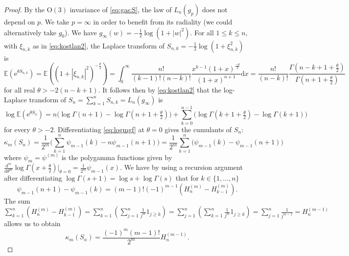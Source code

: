 \documentclass[10pt,a4paper]{amsart}
\begin{document}
\begin{proof}
  By the $\mathrm{O}(3)$ invariance of \eqref{eq:gas:S}, the law of
  $L_n(g_p)$ does not depend on $p$. We take $p=\infty$ in order to benefit from its radiality (we could alternatively take $g_0$). We have
  $g_\infty(w)=-\frac{1}{2}\log(1+|w|^2)$. For all $1\leq k\leq n$, with
  $\xi_{n,k}$ as in \eqref{eq:kostlan2}, the Laplace transform of
  $S_{n,k}=-\frac{1}{2}\log(1+\xi_{n,k}^2)$ is 
  \begin{equation}\label{eq:lap_uinf_wnk}
    \mathbb{E}(\mathrm{e}^{\theta S_{n,k}})
    =\mathbb{E}((1+|\xi_{n,k}|^2)^{-\frac{\theta}{2}})
    =\int_0^\infty\frac{n!}{(k-1)!(n-k)!}\frac{x^{k-1}(1+x)^{\frac{-\theta}{2}}}{(1+x)^{n+1}}\mathrm{d}x
    =\frac{n!}{(n-k)!}\frac{\Gamma(n-k+1+\frac{\theta}{2})}{\Gamma(n+1+\frac{\theta}{2})}
  \end{equation}
  for all real $\theta>-2(n-k+1)$. It follows then by \eqref{eq:kostlan2} that
  the log-Laplace transform of $S_n=\sum_{k=1}^nS_{n,k}=L_n(g_\infty)$ is
  \begin{equation}\label{eq:logmgf}
    \log\mathbb{E}(\mathrm{e}^{\theta S_n})
    =n\bigl(\log\Gamma(n+1)-\log\Gamma(n+1+\tfrac{\theta}{2})\bigr)
    +\sum_{k=0}^{n-1}\bigl(\log\Gamma(k+1+\tfrac{\theta}{2})-\log\Gamma(k+1)\bigr)
  \end{equation}
  for every $\theta > -2$. Differentiating
  \eqref{eq:logmgf} at $\theta=0$ gives the cumulants of $S_n$:
  \begin{equation}\label{eq:cum-psi}
    \kappa_m(S_n)
    =
      \frac{1}{2^m}\big(\sum_{k=1}^n \psi_{m-1}(k)-n\psi_{m-1}(n+1)\big)
    =\frac{1}{2^m}\sum_{k=1}^n \big(\psi_{m-1}(k)-
    \psi_{m-1}(n+1) \big)  
  \end{equation}
  where $\psi_m=\psi^{(m)}$ is the polygamma
  functions given by
  $\frac{\mathrm{d}^m}{\mathrm{d}\theta^m}\log\Gamma(x+\tfrac{\theta}{2})\big|_{\theta=0}=\frac{1}{2^m}\psi_{m-1}(x)$.
  We have by using a recursion argument after
  differentiating $\log \Gamma(s+1) = \log s + \log \Gamma(s)$ that for
  $k \in \{1,\dots,n\}$
  \[\psi_{m-1}(n+1) - \psi_{m-1}(k)
  = (m-1)!(-1)^{m-1}(H_n^{(m)} - H_{k-1}^{(m)}).\]
  The sum
    $\sum_{k=1}^n (H_n^{(m)} - H_{k-1}^{(m)})
  =\sum_{k=1}^n (\sum_{j=1}^n \frac{1}{j^m} 1_{j \geq k})
  =\sum_{j=1}^n (\sum_{k=1}^n \frac{1}{j^m} 1_{j \geq k})
  =\sum_{j=1}^n \frac{1}{j^{m-1}} = H_n^{(m-1)}$ 
  allows us to obtain
   \begin{equation}\label{eq:kappa-harmonic}
    \kappa_m(S_n) = \frac{(-1)^m (m-1)!}{2^m}H_{n}^{(m-1)}.
  \end{equation}
  
\end{proof}
\end{document}
